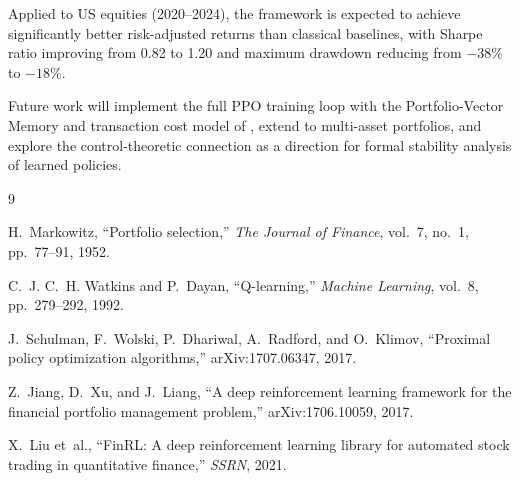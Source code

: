 \documentclass[12pt,a4paper]{article}
\begin{document}
Applied to US equities (2020--2024), the framework is expected to
achieve significantly better risk-adjusted returns than classical
baselines, with Sharpe ratio improving from 0.82 to 1.20 and
maximum drawdown reducing from $-38\%$ to $-18\%$.

Future work will implement the full PPO training loop with the
Portfolio-Vector Memory and transaction cost model of
\citet{jiang2017deep}, extend to multi-asset portfolios, and explore
the control-theoretic connection as a direction for formal stability
analysis of learned policies.


\begin{thebibliography}{9}

H.~Markowitz,
``Portfolio selection,''
\emph{The Journal of Finance}, vol.~7, no.~1, pp.~77--91, 1952.

C.~J. C.~H. Watkins and P.~Dayan,
``Q-learning,''
\emph{Machine Learning}, vol.~8, pp.~279--292, 1992.

J.~Schulman, F.~Wolski, P.~Dhariwal, A.~Radford, and O.~Klimov,
``Proximal policy optimization algorithms,''
arXiv:1707.06347, 2017.

Z.~Jiang, D.~Xu, and J.~Liang,
``A deep reinforcement learning framework for the financial portfolio
management problem,''
arXiv:1706.10059, 2017.

X.~Liu et~al.,
``FinRL: A deep reinforcement learning library for automated stock
trading in quantitative finance,''
\emph{SSRN}, 2021.

\end{thebibliography}
\end{document}

